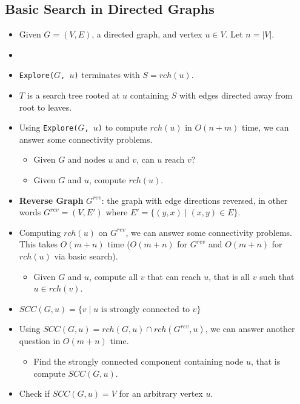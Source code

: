 \subsection{Basic Search in Directed Graphs}
\begin{itemize}
    \item Given $G = (V, E)$, a directed graph, and vertex $u \in V$. Let $n = \left| V \right|$.
    \item[] 
    \item \texttt{Explore($G$, $u$)} terminates with $S = rch(u)$.
    \item $T$ is a search tree rooted at $u$ containing $S$ with edges directed away from root to leaves.
    \item Using \texttt{Explore($G$, $u$)} to compute $rch(u)$ in $O(n + m)$ time, we can answer some connectivity problems.
    \begin{itemize}
        \item Given $G$ and nodes $u$ and $v$, can $u$ reach $v$?
        \item Given $G$ and $u$, compute $rch(u)$.
    \end{itemize}
    \item \textbf{Reverse Graph} $G^{rev}$: the graph with edge directions reversed, in other words $G^{rev} = (V, E')$ where $E' = \{ (y, x) \mid (x, y) \in E \}$.
    \item Computing $rch(u)$ on $G^{rev}$, we can answer some connectivity problems. This takes $O(m + n)$ time ($O(m + n)$ for $G^{rev}$ and $O(m + n)$ for $rch(u)$ via basic search).
    \begin{itemize}
        \item Given $G$ and $u$, compute all $v$ that can reach $u$, that is all $v$ such that $u \in rch(v)$.
    \end{itemize}
    \item $SCC(G, u) = \{ v \mid u \text{ is strongly connected to } v \}$
    \item Using $SCC(G, u) = rch(G, u) \cap rch (G^{rev}, u)$, we can answer another question in $O(m + n)$ time.
    \begin{itemize}
        \item Find the strongly connected component containing node $u$, that is compute $SCC(G, u)$.
    \end{itemize}
    \item Check if $SCC(G, u) = V$ for an arbitrary vertex $u$.
    \begin{itemize}

\end{itemize}
\end{itemize}
